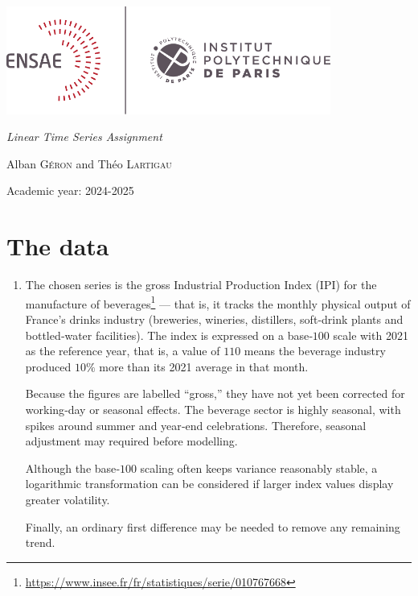 \documentclass[12pt]{article}
\begin{document}
    \begin{center}
        \includegraphics[width=0.8\textwidth]{ensae IP paris.png}

        \vskip4cm

        \Large\bfseries
        \begin{tcolorbox}[
            enhanced, sharp corners,
            colback = ensae!5!white,
            colframe = ensae!60!white,
            boxrule = 0.5pt,
            drop fuzzy shadow = gray
        ]

            \vskip0.3cm

            \emph{\Large Linear Time Series Assignment}
        \end{tcolorbox}

        \vskip4cm

        Alban \textsc{Géron} and Théo \textsc{Lartigau}

        \vskip0.5cm

        Academic year: 2024-2025
    \end{center}

    \newpage
    \restoregeometry

    \section{The data}

    \begin{enumerate}
        \item The chosen series is the gross Industrial Production Index (IPI) for the manufacture of beverages\footnote{\url{https://www.insee.fr/fr/statistiques/serie/010767668}} --- that is, it tracks the monthly physical output of France’s drinks industry (breweries, wineries, distillers, soft‑drink plants and bottled‑water facilities). The index is expressed on a base‑$100$ scale with 2021 as the reference year, that is, a value of $110$ means the beverage industry produced $10 \%$ more than its 2021 average in that month.

        Because the figures are labelled “gross,” they have not yet been corrected for working‑day or seasonal effects. The beverage sector is highly seasonal, with spikes around summer and year‑end celebrations. Therefore, seasonal adjustment may required before modelling.

        Although the base‑$100$ scaling often keeps variance reasonably stable, a logarithmic transformation can be considered if larger index values display greater volatility.

        Finally, an ordinary first difference may be needed to remove any remaining trend.
    \end{enumerate}


\end{document}
